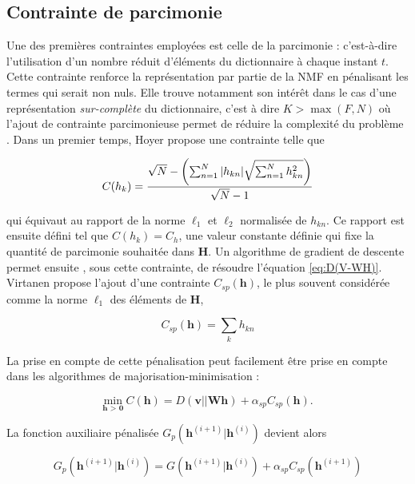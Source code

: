 \subsection{Contrainte de parcimonie}
Une des premières contraintes employées est celle de la parcimonie \cite{hoyer_non-negative_2004, le2015sparse} : c'est-à-dire l'utilisation d'un nombre réduit d'éléments du dictionnaire à chaque instant $t$. Cette contrainte renforce la représentation par partie de la NMF en pénalisant les termes qui serait non nuls. Elle trouve notamment son intérêt dans le cas d'une représentation \textit{sur-complète} du dictionnaire, c'est à dire $K > \max(F,N)$ où l'ajout de contrainte parcimonieuse permet de réduire la complexité du problème \cite{eggert2004sparse}. Dans un premier temps, Hoyer \cite{hoyer_non-negative_2004} propose une contrainte telle que 

\begin{equation}
C(h_k) = \frac{\sqrt{N}-\left( \sum_{n=1}^N \vert h_{kn} \vert \/ \sqrt{\sum_{n = 1}^N h_{kn}^2} \right)}{\sqrt{N}-1}
\end{equation}

qui équivaut au rapport de la norme $\ell_1$ et $\ell_2$ normalisée de $h_{kn}$. Ce rapport est ensuite défini tel que $C(h_k) = C_h$, une valeur constante définie qui fixe la quantité de parcimonie souhaitée dans $\mathbf{H}$. Un algorithme de gradient de descente permet ensuite , sous cette contrainte, de résoudre l'équation \ref{eq:D(V-WH)}. Virtanen \cite{virtanen_monaural_2007} propose l'ajout d'une contrainte $C_{sp}(\mathbf{h})$, le plus souvent considérée comme la norme $\ell_1$ des éléments de $\mathbf{H}$,

\begin{equation}
C_{sp}(\mathbf{h}) = \sum_k h_{kn}
\end{equation}

La prise en compte de cette pénalisation  peut facilement être prise en compte dans les algorithmes de majorisation-minimisation : 

\begin{equation}
\underset{\textbf{h > 0}}{\text{min}}~C(\mathbf{h}) = D(\mathbf{v} \vert\vert \mathbf{Wh}) + \alpha_{sp} C_{sp}(\mathbf{h}).
\end{equation}

La fonction auxiliaire pénalisée $G_p(\mathbf{h}^{(i+1)}\vert \mathbf{h}^{(i)})$ devient alors 

\begin{equation}
G_p(\mathbf{h}^{(i+1)}\vert \mathbf{h}^{(i)}) = G(\mathbf{h}^{(i+1)}\vert \mathbf{h}^{(i)})+ \alpha_{sp}C_{sp}(\mathbf{h}^{(i+1)})
\end{equation}

